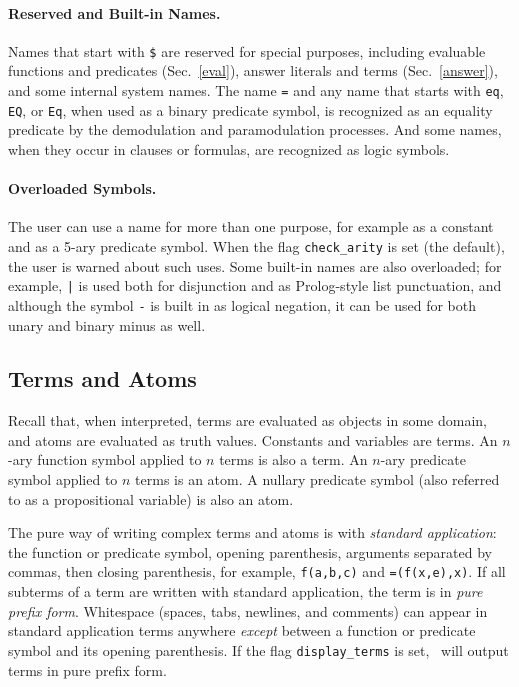 \documentclass[11pt]{article}
\begin{document}
\paragraph{Reserved and Built-in Names.}

Names that start with \verb:$:
are reserved for special purposes,
including evaluable functions and predicates (Sec.~\ref{eval}),
answer literals and terms (Sec.~\ref{answer}), and some internal
system names.  The name \verb:=: and any name that starts with
\verb:eq:, \verb:EQ:, or \verb:Eq:, when used as a binary predicate
symbol, is recognized as an equality predicate by the demodulation
and paramodulation processes.  And some names, when they occur
in clauses or formulas, are recognized as logic symbols.

\paragraph{Overloaded Symbols.}

The user can use a name for more than one purpose, for example
as a constant and as a 5-ary predicate symbol.
When the flag \verb:check_arity: is
set (the default), the user is warned about such uses.  Some built-in
names are also overloaded; for example, \verb:|: is used both for
disjunction and as Prolog-style list punctuation, and although the
symbol \verb:-: is built in as logical negation, it can be
used for both unary and binary minus as well.

\subsection{Terms and Atoms} \label{syntax-terms}

Recall that, when interpreted, terms are evaluated as objects in some
domain, and atoms are evaluated as truth values.  Constants and
variables are terms.  An $n$-ary function symbol applied to $n$ terms
is also a term.  An $n$-ary predicate symbol applied to $n$ terms is an
atom. A nullary predicate symbol (also referred to as a
propositional variable) is also an atom.

The pure way of writing complex terms and
atoms is with {\em standard application}: the function or predicate
symbol, opening parenthesis, arguments separated by commas, then
closing parenthesis, for example, \verb:f(a,b,c): and
\verb:=(f(x,e),x):.  If all subterms of a term are written with
standard application, the term is in {\em pure prefix form}.
Whitespace (spaces, tabs, newlines, and comments) can appear in
standard application terms anywhere {\em except} between a function or
predicate symbol and its opening parenthesis.  If the flag
\verb:display_terms: is set, \otter\ will output terms in pure prefix
form.
\end{document}
